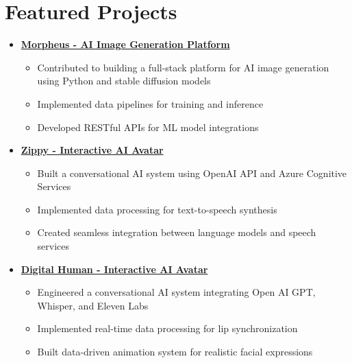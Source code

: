 \documentclass[letterpaper,11pt]{article}
\newcommand{\normalfaExternalLink}{{\mdseries\faExternalLink}}
\begin{document}
\section{Featured Projects}
\begin{itemize}[leftmargin=*]
    \item \textbf{\href{https://github.com/Monadical-SAS/Morpheus}{Morpheus - AI Image Generation Platform \normalfaExternalLink}}
    \begin{itemize}
        \item Contributed to building a full-stack platform for AI image generation using Python and stable diffusion models
        \item Implemented data pipelines for training and inference
        \item Developed RESTful APIs for ML model integrations
    \end{itemize}
    
    \item \textbf{\href{https://github.com/asanchezyali/ai-avatar}{Zippy - Interactive AI Avatar \normalfaExternalLink}}
    \begin{itemize}
        \item Built a conversational AI system using OpenAI API and Azure Cognitive Services
        \item Implemented data processing for text-to-speech synthesis
        \item Created seamless integration between language models and speech services
    \end{itemize}

    \item \textbf{\href{https://github.com/asanchezyali/talking-avatar-with-ai}{Digital Human - Interactive AI Avatar \normalfaExternalLink}}
    \begin{itemize}
        \item Engineered a conversational AI system integrating Open AI GPT, Whisper, and Eleven Labs
        \item Implemented real-time data processing for lip synchronization
        \item Built data-driven animation system for realistic facial expressions
    \end{itemize}
\end{itemize}
\end{document}
